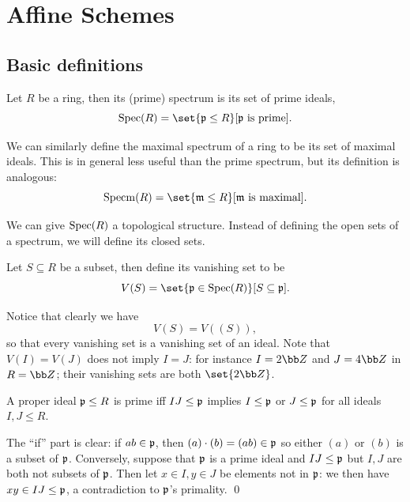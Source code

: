 \section{Affine Schemes}

\subsection{Basic definitions}

\bdefn

    Let $R$ be a ring, then its {\emphcolor (prime) spectrum} is its set of prime ideals,
    $$ \spec(R) = \set{\p\leq R}[\hbox{$\p$ is prime}] . $$

\edefn

\bnote

    We can similarly define the {\emphcolor maximal spectrum} of a ring to be its set of maximal ideals.
    This is in general less useful than the prime spectrum, but its definition is analogous:
    $$ \specm(R) = \set{\m\leq R}[\hbox{$\m$ is maximal}] . $$

\enote

We can give ${\rm Spec}(R)$ a topological structure.
Instead of defining the open sets of a spectrum, we will define its closed sets.

\bdefn

    Let $S\subseteq R$ be a subset, then define its {\emphcolor vanishing set} to be
    $$ V(S) = \set{\p\in\spec(R)}[S\subseteq\p] . $$

\edefn

Notice that clearly we have
$$ V(S) = V((S)) , $$
so that every vanishing set is a vanishing set of an ideal.
Note that $V(I)=V(J)$ does not imply $I=J$: for instance $I=2\bZ$ and $J=4\bZ$ in $R=\bZ$; their vanishing sets are both $\set{2\bZ}$.

\blemm

    A proper ideal ${{\frak p}}\leq R$ is prime iff $IJ\leq{{\frak p}}$ implies $I\leq{{\frak p}}$ or $J\leq{{\frak p}}$ for all ideals $I,J\leq R$.

\elemm

\bproof

    The ``if'' part is clear: if $ab\in{{\frak p}}$, then $(a)\cdot(b)=(ab)\in{{\frak p}}$ so either $(a)$ or $(b)$ is a subset of ${{\frak p}}$.
    Conversely, suppose that ${{\frak p}}$ is a prime ideal and $IJ\leq{{\frak p}}$ but $I,J$ are both not subsets of ${{\frak p}}$.
    Then let $x\in I,y\in J$ be elements not in ${{\frak p}}$: we then have $xy\in IJ\leq{{\frak p}}$, a contradiction to ${{\frak p}}$'s primality.
    \qed

\eproof

